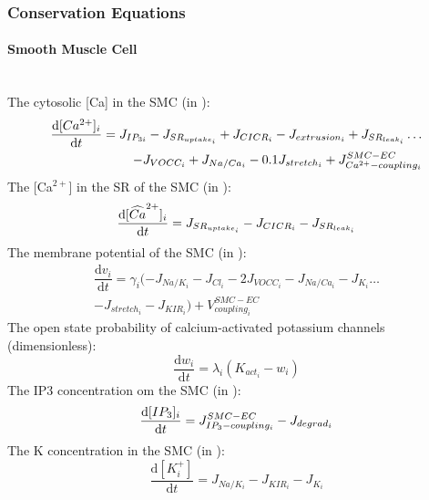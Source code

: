 \subsubsection{Conservation Equations}
\paragraph{Smooth Muscle Cell}~\\
%
The cytosolic [\gls{Ca}] in the \gls{SMC} (in \uM):
\begin{equation}\label{eq:ci}
\begin{split}
\dfrac{\mathrm{d}[Ca^{2+}]_{i}}{\mathrm{d}t} = J_{IP_{3i}} - J_{SR_{uptake_{i}}} + J_{CICR_{i}} - J_{extrusion_{i}} +  J_{SR_{leak_{i}}}\dots \\
 - J_{VOCC_{i}} + J_{Na/Ca_{i}}  - 0.1J_{stretch_{i}} + J_{Ca^{2+}-coupling_{i}}^{SMC-EC}
\end{split} 
\end{equation}
%
The [Ca$^{2+}$] in the \gls{SR} of the \gls{SMC} (in \uM):
\begin{equation} \label{eq:si}
\dfrac{\mathrm{d}[\widehat{Ca}^{2+}]_{i}}{\mathrm{d}t} =  J_{SR_{uptake_{i}}} - J_{CICR_{i}} - J_{SR_{leak_{i}}}
\end{equation}
%
The membrane potential of the \gls{SMC} (in \mV):
\begin{equation} \label{eq:vi}
\begin{split}
\dfrac{\mathrm{d}v_{i}}{\mathrm{d}t} = \gamma_{i}( -J_{Na/K_{i}} - J_{Cl_{i}} - 2J_{VOCC_{i}}- J_{Na/Ca_{i}} - J_{K_{i}} \dots \\
- J_{stretch_{i}} - J_{KIR_{i}} ) +V^{SMC-EC}_{coupling_{i}}
\end{split}
\end{equation}
%
The open state probability of calcium-activated potassium channels (dimensionless):
\begin{equation} \label{eq:dwidt}
\dfrac{\mathrm{d}w_{i}}{\mathrm{d}t} =  \lambda_{i} \left( K_{act_{i}} - w_{i} \right)
\end{equation}
%
The \gls{IP3} concentration om the \gls{SMC} (in \uM):
\begin{equation} \label{eq:dIidt}
\dfrac{\mathrm{d}[IP_{3}] _{i}}{\mathrm{d}t} = J^{SMC-EC}_{IP_{3}-coupling_{i}} - J_{degrad_{i}}
\end{equation}
%
The \gls{K} concentration in the \gls{SMC} (in \uM):
\begin{equation} \label{eq:dkidt}
\dfrac{\mathrm{d} [K^+_{i}]}{\mathrm{d}t}  = J_{Na/K_{i}}  - J_{KIR_{i}} - J_{K_{i}}
\end{equation}

